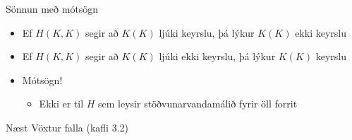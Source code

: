 \documentclass{beamer}
\begin{document}
\begin{frame}{Sönnun með mótsögn}
\begin{itemize}
 \item Ef $H(K, K)$ segir að $K(K)$ ljúki keyrslu, þá lýkur $K(K)$ ekki keyrslu
 \item Ef $H(K, K)$ segir að $K(K)$ ljúki ekki keyrslu, þá lýkur $K(K)$ keyrslu
 \item Mótsögn!
 \begin{itemize}
  \item Ekki er til $H$ sem leysir stöðvunarvandamálið fyrir öll forrit
 \end{itemize}
\end{itemize}

\end{frame}


\begin{frame}{Næst}
Vöxtur falla (kafli 3.2)
\end{frame}
\end{document}
